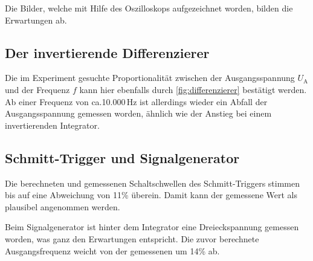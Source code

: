 Die Bilder, welche mit Hilfe des Oszilloskops aufgezeichnet worden, bilden 
die Erwartungen ab.

\subsection{Der invertierende Differenzierer}
Die im Experiment gesuchte Proportionalität zwischen der Ausgangsspannung $U_\text{A}$ und der Frequenz
$f$ kann hier ebenfalls durch \autoref{fig:differenzierer} bestätigt werden.
Ab einer Frequenz von ca.10.000\,Hz ist allerdings wieder ein Abfall der Ausgangsspannung gemessen worden,
ähnlich wie der Anstieg bei einem invertierenden Integrator.

\subsection{Schmitt-Trigger und Signalgenerator}
Die berechneten und gemessenen Schaltschwellen des Schmitt-Triggers stimmen
bis auf eine Abweichung von 11\% überein.
Damit kann der gemessene Wert als plausibel angenommen werden. 

Beim Signalgenerator ist hinter dem Integrator eine Dreieckspannung gemessen worden,
was ganz den Erwartungen entspricht.
Die zuvor berechnete Ausgangsfrequenz weicht von der gemessenen um 14\% ab.